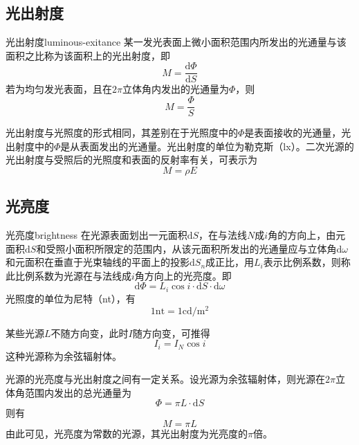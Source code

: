 \documentclass[cn,10pt,chinesefont=founder,math=newtx,cite=super,twoside]{elegantbook}
\begin{document}
\subsection{光出射度}
\begin{definition}{光出射度}{luminous-exitance}
某一发光表面上微小面积范围内所发出的光通量与该面积之比称为该面积上的光出射度，即
\begin{equation}
M=\frac{\mathrm{d}\varPhi}{\mathrm{d}S}
\end{equation}
若为均匀发光表面，且在$2\pi$立体角内发出的光通量为$\varPhi$，则
\begin{equation}
M=\frac{\varPhi}{S}
\end{equation}
\end{definition}
光出射度与光照度的形式相同，其差别在于光照度中的$\varPhi$是表面接收的光通量，光出射度中的$\varPhi$是从表面发出的光通量。光出射度的单位为勒克斯（lx）。二次光源的光出射度与受照后的光照度和表面的反射率有关，可表示为
\begin{equation}
M=\rho E
\end{equation}

\subsection{光亮度}
\begin{definition}{光亮度}{brightness}
	在光源表面划出一元面积$\mathrm{d}S$，在与法线$N$成$i$角的方向上，由元面积$\mathrm{d}S$和受照小面积所限定的范围内，从该元面积所发出的光通量应与立体角$\mathrm{d}\omega$和元面积在垂直于光束轴线的平面上的投影$\mathrm{d}S_n$成正比，用$L_i$表示比例系数，则称此比例系数为光源在与法线成$i$角方向上的光亮度。即
	\begin{equation}
	\mathrm{d}\varPhi=L_i\cos i\cdot\mathrm{d}S\cdot\mathrm{d}\omega
	\end{equation}
	光照度的单位为尼特（nt），有
	\begin{equation}
	1\mathrm{nt}=1\mathrm{cd/m^2}
	\end{equation}
\end{definition}
某些光源$L$不随方向变，此时$I$随方向变，可推得
\begin{equation}
I_i=I_N\cos i
\end{equation}
这种光源称为余弦辐射体。

光源的光亮度与光出射度之间有一定关系。设光源为余弦辐射体，则光源在$2\pi$立体角范围内发出的总光通量为
\begin{equation}
\varPhi=\pi L\cdot\mathrm{d}S
\end{equation}
则有
\begin{equation}
M=\pi L
\end{equation}
由此可见，光亮度为常数的光源，其光出射度为光亮度的$\pi$倍。
\end{document}
